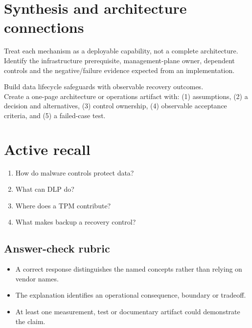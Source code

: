 \documentclass[10pt,letterpaper]{article}
\begin{document}
\section{Synthesis and architecture connections}
Treat each mechanism as a deployable capability, not a complete architecture. Identify the infrastructure prerequisite, management-plane owner, dependent controls and the negative/failure evidence expected from an implementation.
\begin{workbox}[title={Applied deliverable}]
Build data lifecycle safeguards with observable recovery outcomes.\\[4pt]Create a one-page architecture or operations artifact with: (1) assumptions, (2) a decision and alternatives, (3) control ownership, (4) observable acceptance criteria, and (5) a failed-case test.
\end{workbox}
\section{Active recall}
\begin{enumerate}
\item How do malware controls protect data?
\item What can DLP do?
\item Where does a TPM contribute?
\item What makes backup a recovery control?
\end{enumerate}
\subsection{Answer-check rubric}
\begin{itemize}
\item A correct response distinguishes the named concepts rather than relying on vendor names.
\item The explanation identifies an operational consequence, boundary or tradeoff.
\item At least one measurement, test or documentary artifact could demonstrate the claim.
\end{itemize}
\end{document}
